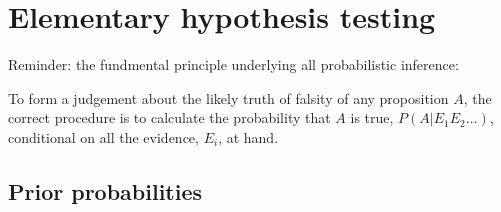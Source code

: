 \documentclass[../jaynes_prob_theory_notes.tex]{subfiles}
\begin{document}
\section{Elementary hypothesis testing}

Reminder: the fundmental principle underlying all probabilistic inference:
\begin{displayquote}
    To form a judgement about the likely truth of falsity of any proposition $A$, the correct procedure is to calculate the probability that $A$ is true, $P(A|E_1E_2\ldots)$, conditional on all the evidence, $E_i$, at hand.
\end{displayquote}

\subsection{Prior probabilities}
\end{document}
